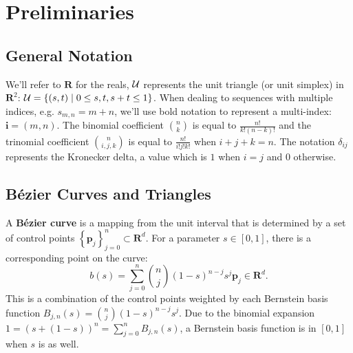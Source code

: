 \chapter{Preliminaries}\label{chap:preliminaries}

\section{General Notation}

We'll refer to \(\mathbf{R}\) for the reals, \(\mathcal{U}\) represents
the unit triangle (or unit simplex) in \(\mathbf{R}^2\):
\(\mathcal{U} = \left\{(s, t) \mid 0 \leq s, t, s + t \leq 1\right\}\).
When dealing to sequences with multiple indices, e.g.
\(s_{m, n} = m + n\), we'll use bold notation to represent
a multi-index: \(\mathbf{i} = (m, n)\). The binomial coefficient
\(\binom{n}{k}\) is equal to \(\frac{n!}{k! (n - k)!}\) and the trinomial
coefficient \(\binom{n}{i, j, k}\) is equal to \(\frac{n!}{i! j! k!}\)
when \(i + j + k = n\). The notation \(\delta_{ij}\) represents the
Kronecker delta, a value which is \(1\) when \(i = j\) and \(0\)
otherwise.

\section{B\'{e}zier Curves and Triangles}

A \textbf{B\'{e}zier curve} is a mapping from the unit interval
that is determined by a set of control points
\(\left\{\mathbf{p}_j\right\}_{j = 0}^n \subset \mathbf{R}^d\).
For a parameter \(s \in \left[0, 1\right]\), there is a corresponding
point on the curve:
\begin{equation}
b(s) = \sum_{j = 0}^n \binom{n}{j} (1 - s)^{n - j} s^j \mathbf{p}_j \in
  \mathbf{R}^d.
\end{equation}
This is a combination of the control points weighted by
each Bernstein basis function
\(B_{j, n}(s) = \binom{n}{j} (1 - s)^{n - j} s^j\).
Due to the binomial expansion
\(1 = (s + (1 - s))^n = \sum_{j = 0}^n B_{j, n}(s)\),
a Bernstein basis function is in
\(\left[0, 1\right]\) when \(s\) is as well.

